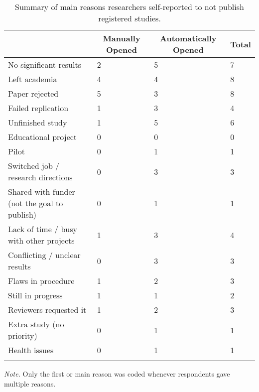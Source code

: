 \documentclass[
  ,jou, a4paper,floatsintext]{apa6}
\begin{document}
\begin{table*}[tbp]

\begin{center}
\begin{threeparttable}

\caption{\label{tab:reasons-non-publish}Summary of main reasons researchers self-reported to not publish registered studies.}

\begin{tabular}{llll}
\toprule
 & \multicolumn{1}{c}{Manually Opened} & \multicolumn{1}{c}{Automatically Opened} & \multicolumn{1}{c}{Total}\\
\midrule
No significant results & 2 & 5 & 7\\
Left academia & 4 & 4 & 8\\
Paper rejected & 5 & 3 & 8\\
Failed replication & 1 & 3 & 4\\
Unfinished study & 1 & 5 & 6\\
Educational project & 0 & 0 & 0\\
Pilot & 0 & 1 & 1\\
Switched job / research directions & 0 & 3 & 3\\
Shared with funder (not the goal to publish) & 0 & 1 & 1\\
Lack of time / busy with other projects & 1 & 3 & 4\\
Conflicting / unclear results & 0 & 3 & 3\\
Flaws in procedure & 1 & 2 & 3\\
Still in progress & 1 & 1 & 2\\
Reviewers requested it & 1 & 2 & 3\\
Extra study (no priority) & 0 & 1 & 1\\
Health issues & 0 & 1 & 1\\
\bottomrule
\addlinespace
\end{tabular}

\begin{tablenotes}[para]
\normalsize{\textit{Note.} Only the first or main reason was coded whenever respondents gave multiple reasons.}
\end{tablenotes}

\end{threeparttable}
\end{center}

\end{table*}
\end{document}
